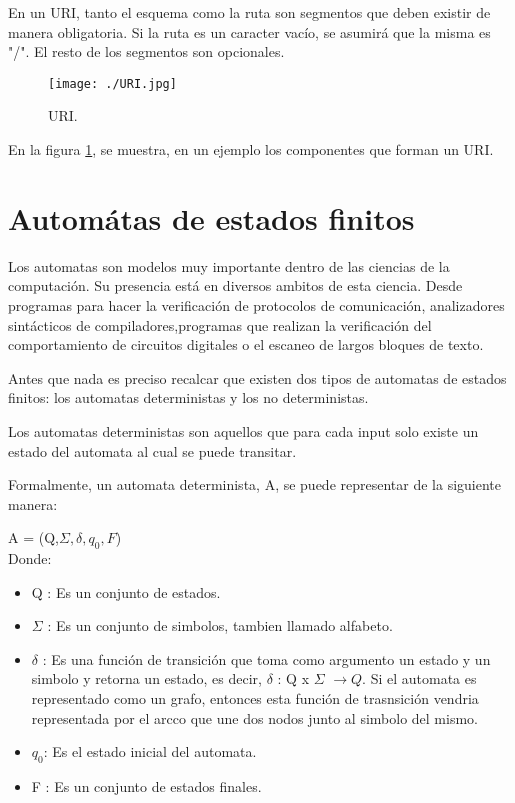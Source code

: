 En un URI, tanto el esquema como la ruta son segmentos que deben existir de manera obligatoria. Si la ruta es un caracter vac\'io, se asumir\'a que la misma es "/". El resto de los segmentos son opcionales.


\begin{figure}
\texttt{[image: ./URI.jpg]}
\caption{URI.}
\label{fig:URI}
\end{figure}

En la figura \ref{fig:URI}, se muestra, en un ejemplo los componentes que forman un URI.


\section{Autom\'atas de estados finitos}

Los automatas son modelos muy importante dentro de las ciencias de la computaci\'on. Su presencia est\'a  en diversos ambitos de esta ciencia. Desde programas para hacer la verificaci\'on de protocolos de comunicaci\'on, analizadores sint\'acticos de compiladores,programas que realizan la verificaci\'on del comportamiento de circuitos digitales o el escaneo de largos bloques de texto.

Antes que nada es preciso recalcar que existen dos tipos de automatas de estados finitos: los automatas deterministas y los no deterministas.

Los automatas deterministas son aquellos que para cada input solo existe un estado del automata al cual se puede transitar.

Formalmente, un automata determinista, A, se puede representar de la siguiente manera:

A = (Q,$\Sigma,\delta,q_{0},F$)\\

Donde:

\begin{itemize}

\item Q : Es un conjunto de estados.
\item $\Sigma$ : Es un conjunto de simbolos, tambien llamado alfabeto.

\item $\delta$ : Es una funci\'on de transici\'on que toma como argumento un estado y un simbolo y retorna un estado, es decir, $\delta$ : Q x $\Sigma$ $\rightarrow Q.$
Si el automata es representado como un grafo, entonces esta funci\'on de trasnsici\'on vendria representada por el arcco que une dos nodos junto al simbolo del mismo.

\item $q_{0}$: Es el estado inicial del automata.

\item F : Es un conjunto de estados finales.

\end{itemize}

